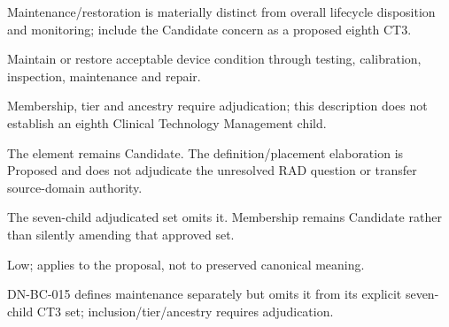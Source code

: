 Maintenance/\allowbreak{}restoration is materially distinct from overall lifecycle disposition and monitoring; include the Candidate concern as a proposed eighth CT3.



Maintain or restore acceptable device condition through testing, calibration, inspection, maintenance and repair.



Membership, tier and ancestry require adjudication; this description does not establish an eighth Clinical Technology Management child.



The element remains Candidate. The definition/\allowbreak{}placement elaboration is Proposed and does not adjudicate the unresolved RAD question or transfer source-domain authority.



The seven-child adjudicated set omits it. Membership remains Candidate rather than silently amending that approved set.


Low; applies to the proposal, not to preserved canonical meaning.

DN-BC-015 defines maintenance separately but omits it from its explicit seven-child CT3 set; inclusion/\allowbreak{}tier/\allowbreak{}ancestry requires adjudication.



